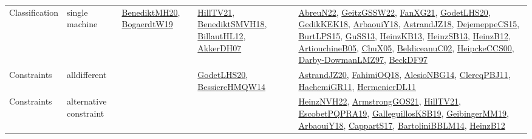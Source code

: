 {\begin{longtable}{lp{3cm}>{\raggedright}p{6cm}>{\raggedright}p{6cm}p{8cm}}
Classification & single machine & \href{articles/BenediktMH20.pdf}{BenediktMH20}\cite{BenediktMH20}, \href{papers/BogaerdtW19.pdf}{BogaerdtW19}\cite{BogaerdtW19} & \href{papers/HillTV21.pdf}{HillTV21}\cite{HillTV21}, \href{papers/BenediktSMVH18.pdf}{BenediktSMVH18}\cite{BenediktSMVH18}, \href{papers/BillautHL12.pdf}{BillautHL12}\cite{BillautHL12}, \href{papers/AkkerDH07.pdf}{AkkerDH07}\cite{AkkerDH07} & \href{articles/AbreuN22.pdf}{AbreuN22}\cite{AbreuN22}, \href{papers/GeitzGSSW22.pdf}{GeitzGSSW22}\cite{GeitzGSSW22}, \href{articles/FanXG21.pdf}{FanXG21}\cite{FanXG21}, \href{papers/GodetLHS20.pdf}{GodetLHS20}\cite{GodetLHS20}, \href{articles/GedikKEK18.pdf}{GedikKEK18}\cite{GedikKEK18}, \href{papers/ArbaouiY18.pdf}{ArbaouiY18}\cite{ArbaouiY18}, \href{papers/AstrandJZ18.pdf}{AstrandJZ18}\cite{AstrandJZ18}, \href{papers/DejemeppeCS15.pdf}{DejemeppeCS15}\cite{DejemeppeCS15}, \href{papers/BurtLPS15.pdf}{BurtLPS15}\cite{BurtLPS15}, \href{papers/GuSS13.pdf}{GuSS13}\cite{GuSS13}, \href{papers/HeinzKB13.pdf}{HeinzKB13}\cite{HeinzKB13}, \href{articles/HeinzSB13.pdf}{HeinzSB13}\cite{HeinzSB13}, \href{papers/HeinzB12.pdf}{HeinzB12}\cite{HeinzB12}, \href{papers/ArtiouchineB05.pdf}{ArtiouchineB05}\cite{ArtiouchineB05}, \href{papers/ChuX05.pdf}{ChuX05}\cite{ChuX05}, \href{papers/BeldiceanuC02.pdf}{BeldiceanuC02}\cite{BeldiceanuC02}, \href{articles/HeipckeCCS00.pdf}{HeipckeCCS00}\cite{HeipckeCCS00}, \href{articles/Darby-DowmanLMZ97.pdf}{Darby-DowmanLMZ97}\cite{Darby-DowmanLMZ97}, \href{papers/BeckDF97.pdf}{BeckDF97}\cite{BeckDF97}\\
Constraints & alldifferent &  & \href{papers/GodetLHS20.pdf}{GodetLHS20}\cite{GodetLHS20}, \href{papers/BessiereHMQW14.pdf}{BessiereHMQW14}\cite{BessiereHMQW14} & \href{articles/AstrandJZ20.pdf}{AstrandJZ20}\cite{AstrandJZ20}, \href{articles/FahimiOQ18.pdf}{FahimiOQ18}\cite{FahimiOQ18}, \href{papers/AlesioNBG14.pdf}{AlesioNBG14}\cite{AlesioNBG14}, \href{papers/ClercqPBJ11.pdf}{ClercqPBJ11}\cite{ClercqPBJ11}, \href{articles/HachemiGR11.pdf}{HachemiGR11}\cite{HachemiGR11}, \href{papers/HermenierDL11.pdf}{HermenierDL11}\cite{HermenierDL11}\\
Constraints & alternative constraint &  &  & \href{articles/HeinzNVH22.pdf}{HeinzNVH22}\cite{HeinzNVH22}, \href{papers/ArmstrongGOS21.pdf}{ArmstrongGOS21}\cite{ArmstrongGOS21}, \href{papers/HillTV21.pdf}{HillTV21}\cite{HillTV21}, \href{articles/EscobetPQPRA19.pdf}{EscobetPQPRA19}\cite{EscobetPQPRA19}, \href{papers/GalleguillosKSB19.pdf}{GalleguillosKSB19}\cite{GalleguillosKSB19}, \href{papers/GeibingerMM19.pdf}{GeibingerMM19}\cite{GeibingerMM19}, \href{papers/ArbaouiY18.pdf}{ArbaouiY18}\cite{ArbaouiY18}, \href{papers/CappartS17.pdf}{CappartS17}\cite{CappartS17}, \href{papers/BartoliniBBLM14.pdf}{BartoliniBBLM14}\cite{BartoliniBBLM14}, \href{papers/HeinzB12.pdf}{HeinzB12}\cite{HeinzB12}\\

\end{longtable}}
